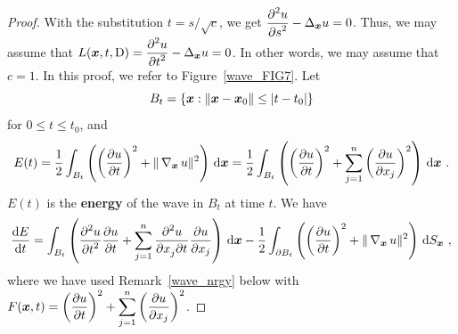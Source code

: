 
\begin{proof}
With the substitution $t = s/\sqrt{c}$, we get
$\DS \pdydxn{u}{s}{2} - \Delta_{\VEC{x}} u = 0$.  Thus, we
may assume that
$\DS L(\VEC{x},t,\diff) =
\pdydxn{u}{t}{2} - \Delta_{\VEC{x}} u = 0$.  In
other words, we may assume that $c=1$.  In this proof, we refer to
Figure~\ref{wave_FIG7}. Let
\[
B_t = \left\{ \VEC{x} : \|\VEC{x} - \VEC{x}_0\| \leq |t-t_0| \right\}
\]
for $0\leq t \leq t_0$, and
\[
E(t) = \frac{1}{2} \int_{B_t} \left(
\left(\pdydx{u}{t}\right)^2 + \|\graD_{\VEC{x}} u \|^2 \right) \dx{\VEC{x}}
= \frac{1}{2} \int_{B_t} \left( \left(\pdydx{u}{t}\right)^2 + \sum_{j=1}^n
\left(\pdydx{u}{x_j} \right)^2 \right) \dx{\VEC{x}} \ .
\]
$E(t)$ is the {\bfseries energy}
of the wave in $B_t$ at time $t$.  We have
\[
\dydx{E}{t} = \int_{B_t} \left( \pdydxn{u}{t}{2} \pdydx{u}{t} +
\sum_{j=1}^n \pdydxnm{u}{x_j}{t}{2}{}{} \pdydx{u}{x_j} \right) \dx{\VEC{x}}
- \frac{1}{2} \int_{\partial B_t} \left( \left(\pdydx{u}{t}\right)^2 +
\|\graD_{\VEC{x}} u \|^2 \right) \dss{S}{x} \ ,
\]
where we have used Remark~\ref{wave_nrgy} below with
$\DS F(\VEC{x},t) = \left(\pdydx{u}{t}\right)^2 +
\sum_{j=1}^n \left(\pdydx{u}{x_j}\right)^2$.


\end{proof}
